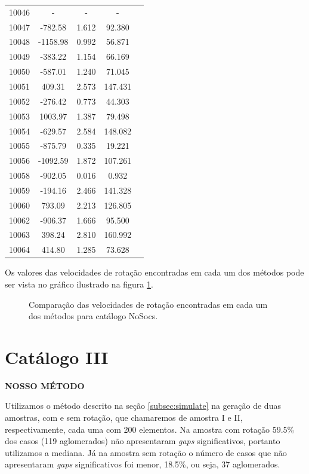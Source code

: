 {\begin{longtable}{ccccc}
10046 & - & - & - \\
10047 & -782.58 & 1.612 & 92.380\\
10048 & -1158.98 & 0.992 & 56.871\\
10049 & -383.22 & 1.154 & 66.169\\
10050 & -587.01 & 1.240 & 71.045\\
10051 & 409.31 & 2.573 & 147.431\\
10052 & -276.42 & 0.773 & 44.303\\
10053 & 1003.97 & 1.387 & 79.498\\
10054 & -629.57 & 2.584 & 148.082\\
10055 & -875.79 & 0.335 & 19.221\\
10056 & -1092.59 & 1.872 & 107.261\\
10058 & -902.05 & 0.016 & 0.932\\
10059 & -194.16 & 2.466 & 141.328\\
10060 & 793.09 & 2.213 & 126.805\\
10062 & -906.37 & 1.666 & 95.500\\
10063 & 398.24 & 2.810 & 160.992\\
10064 & 414.80 & 1.285 & 73.628\\ \hline
\end{longtable}
}

Os valores das velocidades de rotação encontradas em cada um dos métodos pode ser vista no gráfico ilustrado na figura \ref{vrotnosocs}.

\begin{figure}[H] %
\vspace{-2pt}
\centering
{}
\caption{Comparação das velocidades de rotação encontradas em cada um dos métodos para catálogo NoSocs.}
\label{vrotnosocs}
\end{figure}

\section{Catálogo III}
\textbf{NOSSO MÉTODO}

Utilizamos o método descrito na seção \ref{subsec:simulate} na geração de duas amostras, com e sem rotação, que chamaremos de amostra I e II, respectivamente, cada uma com 200 elementos. Na amostra com rotação 59.5\% dos casos (119 aglomerados) não apresentaram \textit{gaps} significativos, portanto utilizamos a mediana. Já na amostra sem rotação o número de casos que não apresentaram \textit{gaps} significativos foi menor, 18.5\%, ou seja, 37 aglomerados.


